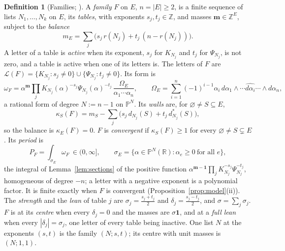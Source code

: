 \documentclass[11pt]{article}
\theoremstyle{plain}
\theoremstyle{definition}
\newtheorem{defn}[prop]{Definition}
\theoremstyle{remark}
\newcommand{\cL}{\mathcal L}
\newcommand{\R}{\mathbb R}
\newcommand{\Z}{\mathbb Z}
\newcommand{\PP}{\mathbb P}
\newcommand{\bm}{\mathbf m}
\begin{document}
\begin{defn}[Families; {\cite[Def.~8.1, p.~53; Thm.~8.10, p.~56; Def.~9.1, p.~61]{F}}]\label{def:family}
A \emph{family} $F$ on $E$, $n=|E|\ge2$, is a finite sequence of lists $N_1,\dots,N_k$ on $E$, its \emph{tables}, with exponents $s_j,t_j\in\Z$, and masses $\bm\in\Z^E$, subject to the \emph{balance}
\[
m_E=\sum_j\big(s_j\,r(N_j)+t_j\,(n-r(N_j))\big).
\]
A letter of a table is \emph{active} when its exponent, $s_j$ for $K_{N_j}$ and $t_j$ for $\Psi_{N_j}$, is not zero, and a table is active when one of its letters is. The letters of $F$ are $\cL(F)=\{K_{N_j}:s_j\neq0\}\cup\{\Psi_{N_j}:t_j\neq0\}$. Its form is
\[
\omega_F=\alpha^{\bm}\prod_jK_{N_j}(\alpha)^{-s_j}\Psi_{N_j}(\alpha)^{-t_j}\,\frac{\Omega_E}{\alpha_1\cdots\alpha_n},\qquad \Omega_E=\sum_{i=1}^n(-1)^{i-1}\alpha_i\,d\alpha_1\wedge\cdots\widehat{d\alpha_i}\cdots\wedge d\alpha_n,
\]
a rational form of degree $N:=n-1$ on $\PP^{N}$. Its \emph{walls} are, for $\varnothing\neq S\subseteq E$,
\[
\kappa_S(F)=m_S-\sum_j\big(s_j\,d_{N_j}(S)+t_j\,d^\ast_{N_j}(S)\big),
\]
so the balance is $\kappa_E(F)=0$. $F$ is \emph{convergent} if $\kappa_S(F)\ge1$ for every $\varnothing\neq S\subsetneq E$. Its \emph{period} is
\[
P_F=\int_{\sigma_E}\omega_F\ \in(0,\infty],\qquad \sigma_E=\{\alpha\in\PP^{N}(\R):\alpha_e\ge0\ \text{for all }e\},
\]
the integral of Lemma~\ref{lem:sections} of the positive function $\alpha^{\bm-\mathbf 1}\prod_jK_{N_j}^{-s_j}\Psi_{N_j}^{-t_j}$, homogeneous of degree $-n$; a letter with a negative exponent is a polynomial factor. It is finite exactly when $F$ is convergent (Proposition~\ref{prop:model}(ii)). The \emph{strength} and the \emph{lean} of table $j$ are $\sigma_j=\frac{s_j+t_j}2$ and $\delta_j=\frac{s_j-t_j}2$, and $\sigma=\sum_j\sigma_j$. $F$ is at its \emph{centre} when every $\delta_j=0$ and the masses are $\sigma\mathbf 1$, and at a \emph{full lean} when every $|\delta_j|=\sigma_j$, one letter of every table being inactive. One list $N$ at the exponents $(s,t)$ is the family $(N;s,t)$; its centre with unit masses is $(N;1,1)$.
\end{defn}
\end{document}
